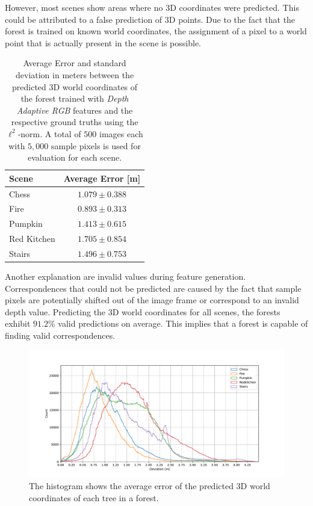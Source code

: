 \documentclass[final]{cvpr}
\begin{document}
However, most scenes show areas where no 3D coordinates
were predicted. This could be attributed to a false prediction of 3D points. Due to the fact that the forest is 
trained on known world coordinates, the assignment of a pixel to a world point that is actually present in the 
scene is possible. 

\begin{table}
	\begin{center}
	\begin{tabular}{|l|c|}
	\hline
	Scene & Average Error [m]\\
	\hline\hline
	Chess 		& 	$1.079 \pm 0.388$ \\
	Fire 		& 	$0.893 \pm 0.313$	\\
	Pumpkin 	& 	$1.413 \pm 0.615$ \\
	Red Kitchen 	& 	$1.705 \pm 0.854$ \\
	Stairs 		& 	$1.496 \pm 0.753$ \\
	\hline
	\end{tabular}
	\end{center}
	\caption{Average Error and standard deviation in meters between the predicted 3D world coordinates of the 
	forest trained with 
	\textit{Depth Adaptive RGB} features and the respective ground truths using the $\ell^2$-norm. A total of
	$500$ images each with $5,000$ sample pixels is used for evaluation for each scene.}
	\label{tab:forest-error}
\end{table}

Another explanation are invalid values during feature generation. Correspondences that could not be predicted are
caused by the fact that sample pixels are potentially shifted out of the image frame or correspond to an invalid depth value. 
Predicting the 3D world coordinates for all scenes, the forests exhibit $91.2\%$ valid predictions on average. 
This implies that a forest is capable of finding valid correspondences.

\begin{figure}
	\begin{center}
	\includegraphics[width=\textwidth]{images/hist.pdf}
	\end{center}
	\caption{The histogram shows the average error of the predicted 3D world coordinates of each tree in a forest. }
	\label{fig:error-hist}
\end{figure}
\end{document}
